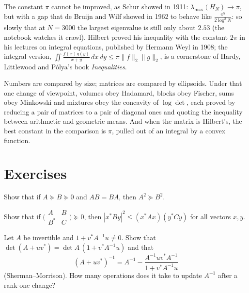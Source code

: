 The constant $\pi$ cannot be improved, as Schur showed in 1911: $\lambda_{\max}(H_N)\to\pi$, but with a gap that de Bruijn and Wilf
showed in 1962 to behave like $\frac{\pi^5}{2\log^2N}$: so slowly that at $N=3000$ the largest eigenvalue is still only about $2.53$
(the notebook watches it crawl). Hilbert proved his inequality with the
constant $2\pi$ in his lectures on integral equations, published by Hermann Weyl in 1908; the integral version,
$\iint\frac{f(x)g(y)}{x+y}\,dx\,dy\le\pi\|f\|_2\|g\|_2$, is a cornerstone of Hardy, Littlewood and P\'olya's book \emph{Inequalities}.

\begin{beauty}
Numbers are compared by size; matrices are compared by ellipsoids. Under that one change of viewpoint, volumes obey Hadamard,
blocks obey Fischer, sums obey Minkowski and mixtures obey the concavity of $\log\det$, each proved by reducing a pair of matrices to a
pair of diagonal ones and quoting the inequality between arithmetic and geometric means. And when the matrix is Hilbert's, the
best constant in the comparison is $\pi$, pulled out of an integral by a convex function.
\end{beauty}

\section{Exercises}

\begin{exercise}[$\star$]\label{ex:commutingsquare}
Show that if $A\succeq B\succeq0$ and $AB=BA$, then $A^2\succeq B^2$.
\end{exercise}

\begin{exercise}[$\star$]\label{ex:blockcs}
Show that if $\bigl(\begin{smallmatrix}A&B\\B^*&C\end{smallmatrix}\bigr)\succeq0$, then $|x^*By|^2\le(x^*Ax)(y^*Cy)$ for all vectors $x,y$.
\end{exercise}

\begin{exercise}[$\star\star$]\label{ex:sherman}
Let $A$ be invertible and $1+v^*A^{-1}u\ne0$. Show that $\det(A+uv^*)=\det A\,(1+v^*A^{-1}u)$ and that
\[
(A+uv^*)^{-1}=A^{-1}-\frac{A^{-1}uv^*A^{-1}}{1+v^*A^{-1}u}
\]
(Sherman--Morrison). How many operations does it take to update $A^{-1}$ after a rank-one change?
\end{exercise}

